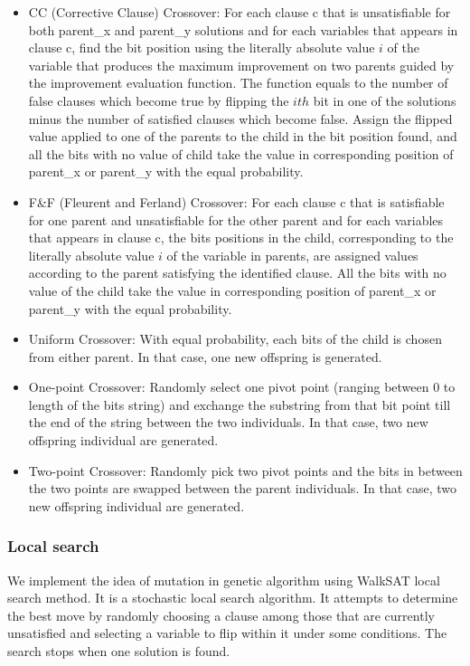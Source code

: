 \begin{itemize}
	\item
	      CC (Corrective Clause) Crossover: For each clause c that is unsatisfiable for
	      both parent\_x and parent\_y solutions and for each variables that appears in
	      clause c, find the bit position using the literally absolute value
	      $i$ of the variable that produces the maximum improvement on
	      two parents guided by the improvement evaluation function. The function equals
	      to the number of false clauses which become true by ﬂipping the
	      $ith$ bit in one of the solutions minus the number of satisﬁed
	      clauses which become false. Assign the flipped value applied to one of the
	      parents to the child in the bit position found, and all the bits with no value
	      of child take the value in corresponding position of parent\_x or parent\_y
	      with the equal probability.
	\item
	      F\&F (Fleurent and Ferland) Crossover: For each clause c that is satisfiable
	      for one parent and unsatisfiable for the other parent and for each variables
	      that appears in clause c, the bits positions in the child, corresponding to
	      the literally absolute value $i$ of the variable in parents,
	      are assigned values according to the parent satisfying the identified clause.
	      All the bits with no value of the child take the value in corresponding
	      position of parent\_x or parent\_y with the equal probability.
	\item
	      Uniform Crossover: With equal probability, each bits of the child is chosen
	      from either parent. In that case, one new offspring is generated.
	\item
	      One-point Crossover: Randomly select one pivot point (ranging between 0 to
	      length of the bits string) and exchange the substring from that bit point till
	      the end of the string between the two individuals. In that case, two new
	      offspring individual are generated.
	\item
	      Two-point Crossover: Randomly pick two pivot points and the bits in between
	      the two points are swapped between the parent individuals. In that case, two
	      new offspring individual are generated.
\end{itemize}

\subsubsection{Local search}
We implement the idea of mutation in genetic algorithm using WalkSAT local
search method. It is a stochastic local search algorithm. It attempts to
determine the best move by randomly choosing a clause among those that are
currently unsatisfied and selecting a variable to flip within it under some
conditions. The search stops when one solution is found.

